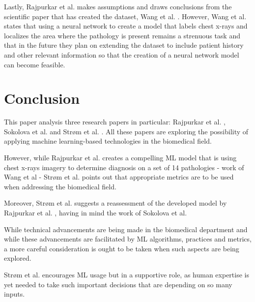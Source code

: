 \documentclass[fullpage]{article}
\begin{document}
\begin{multicols}{2}
Lastly, Rajpurkar et al. \cite{Rajpurkar} makes assumptions and draws conclusions from the scientific paper that has created the dataset, Wang et al. \cite{Wang}. However, Wang et al. \cite{Wang} states that using a neural network to create a model that labels chest x-rays and localizes the area where the pathology is present remains a strenuous task and that in the future they plan on extending the dataset to include patient history and other relevant information so that the creation of a neural network model can become feasible.

\section{Conclusion}
This paper analysis three research papers in particular: Rajpurkar et al. \cite{Rajpurkar}, Sokolova et al. \cite{Sokolova2006} and Strøm et al. \cite{Strom2018}. All these papers are exploring the possibility of applying machine learning-based technologies in the biomedical field. 

However, while Rajpurkar et al. \cite{Rajpurkar} creates a compelling ML model that is using chest x-rays imagery to determine diagnosis on a set of 14 pathologies - work of Wang et al \cite{Wang} - Strøm et al. \cite{Strom2018} points out that appropriate metrics are to be used when addressing the biomedical field. 

Moreover, Strøm et al. \cite{} suggests a reassessment of the developed model by Rajpurkar et al. \cite{Rajpurkar}, having in mind the work of Sokolova et al. \cite{Sokolova2006} 

While technical advancements are being made in the biomedical department and while these advancements are facilitated by ML algorithms, practices and metrics, a more careful consideration is ought to be taken when such aspects are being explored.

Strøm et al. \cite{Strom2018} encourages ML usage but in a supportive role, as human expertise is yet needed to take such important decisions that are depending on so many inputs.


\end{multicols}


\end{document}
